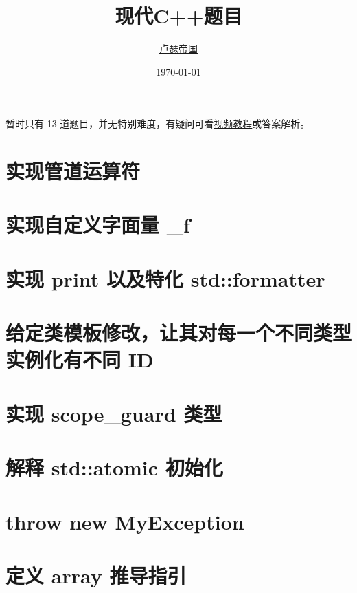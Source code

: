 \documentclass[11pt,fancyhdr]{ctexart}
\title{现代C++题目}
\author{\href{https://github.com/Mq-b/Loser-HomeWork}{卢瑟帝国}\\}
\date{\today}
\begin{document}
\maketitle

\tableofcontents
\newpage

暂时只有 13 道题目，并无特别难度，有疑问可看\href{https://www.bilibili.com/video/BV1Zj411r7eP/}{视频教程}或答案解析。


\section{实现管道运算符}


\section{实现自定义字面量 \_f}

\section{实现 print 以及特化 std::formatter}



\section{给定类模板修改，让其对每一个不同类型实例化有不同 ID}


\section{实现 scope\_guard 类型}


\section{解释 std::atomic 初始化}


\section{throw new MyException}


\section{定义 array 推导指引}

\end{document}
